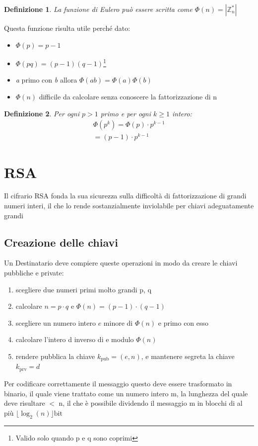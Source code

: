 \documentclass[12pt, a4paper]{report}
\newtheorem{definition}{Definizione}[section]
\begin{document}
\begin{definition}
    La funzione di Eulero può essere scritta come $\Phi(n) = \left\lvert \mathbb{Z}_n^*\right\rvert $
\end{definition}

Questa funzione risulta utile perché dato: 
\begin{itemize}
    \item $\Phi(p) = p - 1$
    \item $\Phi(pq) = (p - 1)(q - 1)$\footnote{Valido solo quando p e q sono coprimi}
    \item \textit{a} primo con \textit{b} allora $\Phi(ab) = \Phi(a)\Phi(b)$
    \item $\Phi(n)$ difficile da calcolare senza conoscere la fattorizzazione di n
\end{itemize}
\begin{definition}
    Per ogni $p > 1$ primo e per ogni $k \geq 1$  intero:
    \begin{align}
        \Phi(p^k) = \Phi(p) \cdot p^{k-1}
                \\ = (p-1)\cdot p^{k-1}
    \end{align}
\end{definition}

\section{RSA}

Il cifrario RSA fonda la sua sicurezza sulla difficoltà di fattorizzazione di grandi numeri interi, il che lo rende sostanzialmente inviolabile per chiavi adeguatamente grandi

\subsection{Creazione delle chiavi}

Un Destinatario deve compiere queste operazioni in modo da creare le chiavi pubbliche e private:
\begin{enumerate}
	\item scegliere due numeri primi molto grandi p, q
	
	\item calcolare $n = p \cdot q $ e $\Phi (n) = (p - 1)\cdot(q - 1)$
	
	\item scegliere un numero intero $e$ minore di $\Phi (n)$ e primo con esso

	\item calcolare l'intero d inverso di e modulo $\Phi (n)$

	\item rendere pubblica la chiave $k_{\text{pub}} = (e, n)$, e mantenere segreta la chiave $k_{\text{prv}} = d$
\end{enumerate}
Per codificare correttamente il messaggio questo deve essere trasformato in binario, il quale viene trattato come un numero intero m, la lunghezza del quale deve risultare $<$ n, il che è possibile dividendo il messaggio m in blocchi di al più $\lfloor \log_2(n) \rfloor \text{bit}$
\end{document}
